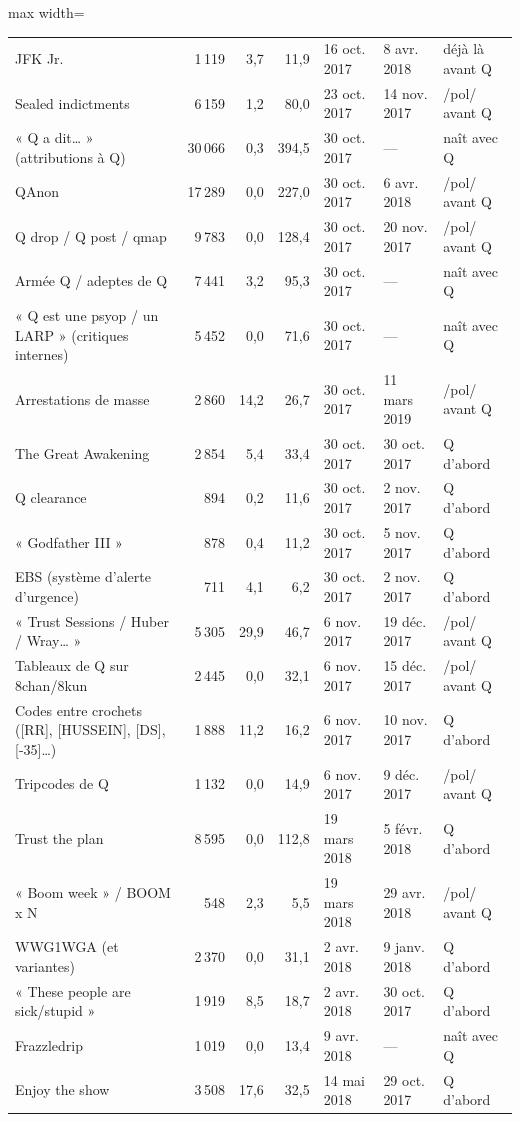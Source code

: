 \documentclass[11pt,a4paper]{article}
\begin{document}
\begin{table}[htbp]
\begin{adjustbox}{max width=\linewidth}
\begin{tabular}{lrrrlll}
JFK Jr. & 1 119 & 3,7 & 11,9 & 16 oct. 2017 & 8 avr. 2018 & déjà là avant Q \\
Sealed indictments & 6 159 & 1,2 & 80,0 & 23 oct. 2017 & 14 nov. 2017 & /pol/ avant Q \\
« Q a dit… » (attributions à Q) & 30 066 & 0,3 & 394,5 & 30 oct. 2017 & — & naît avec Q \\
QAnon & 17 289 & 0,0 & 227,0 & 30 oct. 2017 & 6 avr. 2018 & /pol/ avant Q \\
Q drop / Q post / qmap & 9 783 & 0,0 & 128,4 & 30 oct. 2017 & 20 nov. 2017 & /pol/ avant Q \\
Armée Q / adeptes de Q & 7 441 & 3,2 & 95,3 & 30 oct. 2017 & — & naît avec Q \\
« Q est une psyop / un LARP » (critiques internes) & 5 452 & 0,0 & 71,6 & 30 oct. 2017 & — & naît avec Q \\
Arrestations de masse & 2 860 & 14,2 & 26,7 & 30 oct. 2017 & 11 mars 2019 & /pol/ avant Q \\
The Great Awakening & 2 854 & 5,4 & 33,4 & 30 oct. 2017 & 30 oct. 2017 & Q d'abord \\
Q clearance & 894 & 0,2 & 11,6 & 30 oct. 2017 & 2 nov. 2017 & Q d'abord \\
« Godfather III » & 878 & 0,4 & 11,2 & 30 oct. 2017 & 5 nov. 2017 & Q d'abord \\
EBS (système d'alerte d'urgence) & 711 & 4,1 & 6,2 & 30 oct. 2017 & 2 nov. 2017 & Q d'abord \\
« Trust Sessions / Huber / Wray… » & 5 305 & 29,9 & 46,7 & 6 nov. 2017 & 19 déc. 2017 & /pol/ avant Q \\
Tableaux de Q sur 8chan/8kun & 2 445 & 0,0 & 32,1 & 6 nov. 2017 & 15 déc. 2017 & /pol/ avant Q \\
Codes entre crochets ([RR], [HUSSEIN], [DS], [-35]…) & 1 888 & 11,2 & 16,2 & 6 nov. 2017 & 10 nov. 2017 & Q d'abord \\
Tripcodes de Q & 1 132 & 0,0 & 14,9 & 6 nov. 2017 & 9 déc. 2017 & /pol/ avant Q \\
Trust the plan & 8 595 & 0,0 & 112,8 & 19 mars 2018 & 5 févr. 2018 & Q d'abord \\
« Boom week » / BOOM x N & 548 & 2,3 & 5,5 & 19 mars 2018 & 29 avr. 2018 & /pol/ avant Q \\
WWG1WGA (et variantes) & 2 370 & 0,0 & 31,1 & 2 avr. 2018 & 9 janv. 2018 & Q d'abord \\
« These people are sick/stupid » & 1 919 & 8,5 & 18,7 & 2 avr. 2018 & 30 oct. 2017 & Q d'abord \\
Frazzledrip & 1 019 & 0,0 & 13,4 & 9 avr. 2018 & — & naît avec Q \\
Enjoy the show & 3 508 & 17,6 & 32,5 & 14 mai 2018 & 29 oct. 2017 & Q d'abord \\
\bottomrule
\end{tabular}
\end{adjustbox}
\end{table}
\end{document}
